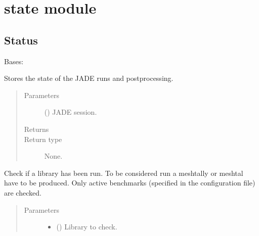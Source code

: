 \documentclass[letterpaper,10pt,english]{sphinxmanual}
\begin{document}
\section{state module}
\label{\detokenize{api/initobjects:state-module}}

\subsection{Status}
\label{\detokenize{api/initobjects:status}}\label{\detokenize{api/initobjects:statusob}}

\begin{fulllineitems}
\label{\detokenize{api/initobjects:status.Status}}
\sphinxAtStartPar
Bases: 

\sphinxAtStartPar
Stores the state of the JADE runs and post\sphinxhyphen{}processing.
\begin{quote}\begin{description}
\item[{Parameters}] \leavevmode
\sphinxAtStartPar
{} ({\hyperref[\detokenize{api/initobjects:main.Session}]{}}) \textendash{} JADE session.

\item[{Returns}] \leavevmode
\sphinxAtStartPar


\item[{Return type}] \leavevmode
\sphinxAtStartPar
None.

\end{description}\end{quote}

\begin{fulllineitems}
\label{\detokenize{api/initobjects:status.Status.check_lib_run}}
\sphinxAtStartPar
Check if a library has been run. To be considered run a meshtally or
meshtal have to be produced. Only active benchmarks (specified in
the configuration file) are checked.
\begin{quote}\begin{description}
\item[{Parameters}] \leavevmode\begin{itemize}
\item {} 
\sphinxAtStartPar
{} () \textendash{} Library to check.


\end{itemize}
\end{description}
\end{quote}
\end{fulllineitems}
\end{fulllineitems}
\end{document}
